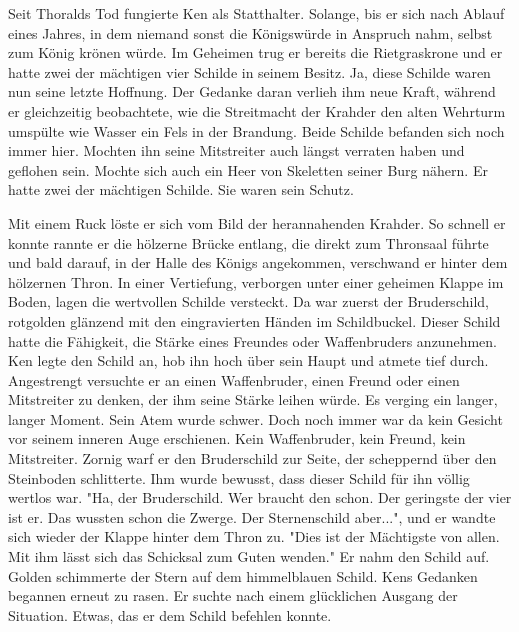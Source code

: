 \documentclass[10pt, a4paper, oneside]{book}
\begin{document}
\begin{multicols}{2}
Seit Thoralds Tod fungierte Ken als Statthalter. Solange, bis er sich nach Ablauf eines Jahres, in dem niemand sonst die Königswürde in Anspruch nahm, selbst zum König krönen würde. Im Geheimen trug er bereits die Rietgraskrone und er hatte zwei der mächtigen vier Schilde in seinem Besitz. Ja, diese Schilde waren nun seine letzte Hoffnung. Der Gedanke daran verlieh ihm neue Kraft, während er gleichzeitig beobachtete, wie die Streitmacht der Krahder den alten Wehrturm umspülte wie Wasser ein Fels in der Brandung. Beide Schilde befanden sich noch immer hier. Mochten ihn seine Mitstreiter auch längst verraten haben und geflohen sein. Mochte sich auch ein Heer von Skeletten seiner Burg nähern. Er hatte zwei der mächtigen Schilde. Sie waren sein Schutz.

Mit einem Ruck löste er sich vom Bild der herannahenden Krahder. So schnell er konnte rannte er die hölzerne Brücke entlang, die direkt zum Thronsaal führte und bald darauf, in der Halle des Königs angekommen, verschwand er hinter dem hölzernen Thron. In einer Vertiefung, verborgen unter einer geheimen Klappe im Boden, lagen die wertvollen Schilde versteckt. Da war zuerst der Bruderschild, rotgolden glänzend mit den eingravierten Händen im Schildbuckel. Dieser Schild hatte die Fähigkeit, die Stärke eines Freundes oder Waffenbruders anzunehmen. Ken legte den Schild an, hob ihn hoch über sein Haupt und atmete tief durch. Angestrengt versuchte er an einen Waffenbruder, einen Freund oder einen Mitstreiter zu denken, der ihm seine Stärke leihen würde. Es verging ein langer, langer Moment. Sein Atem wurde schwer. Doch noch immer war da kein Gesicht vor seinem inneren Auge erschienen. Kein Waffenbruder, kein Freund, kein Mitstreiter. Zornig warf er den Bruderschild zur Seite, der scheppernd über den Steinboden schlitterte. Ihm wurde bewusst, dass dieser Schild für ihn völlig wertlos war. "Ha, der Bruderschild. Wer braucht den schon. Der geringste der vier ist er. Das wussten schon die Zwerge. Der Sternenschild aber...", und er wandte sich wieder der Klappe hinter dem Thron zu. "Dies ist der Mächtigste von allen. Mit ihm lässt sich das Schicksal zum Guten wenden." Er nahm den Schild auf. Golden schimmerte der Stern auf dem himmelblauen Schild. Kens Gedanken begannen erneut zu rasen. Er suchte nach einem glücklichen Ausgang der Situation. Etwas, das er dem Schild befehlen konnte.


\end{multicols}
\end{document}
